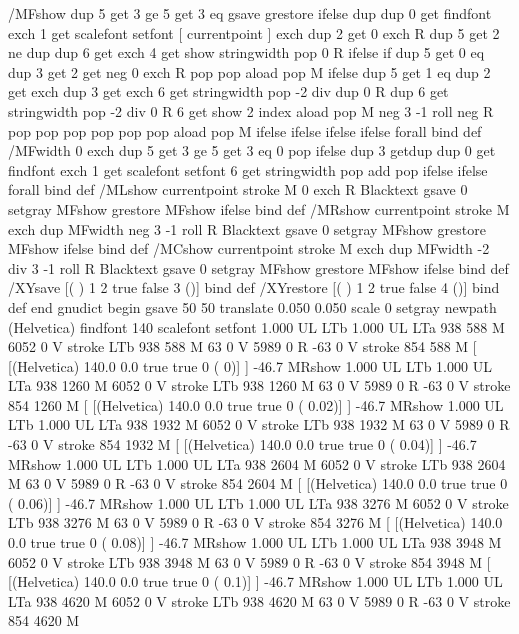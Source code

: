 /MFshow {
   { dup 5 get 3 ge
     { 5 get 3 eq {gsave} {grestore} ifelse }
     {dup dup 0 get findfont exch 1 get scalefont setfont
     [ currentpoint ] exch dup 2 get 0 exch R dup 5 get 2 ne {dup dup 6
     get exch 4 get {show} {stringwidth pop 0 R} ifelse }if dup 5 get 0 eq
     {dup 3 get {2 get neg 0 exch R pop} {pop aload pop M} ifelse} {dup 5
     get 1 eq {dup 2 get exch dup 3 get exch 6 get stringwidth pop -2 div
     dup 0 R} {dup 6 get stringwidth pop -2 div 0 R 6 get
     show 2 index {aload pop M neg 3 -1 roll neg R pop pop} {pop pop pop
     pop aload pop M} ifelse }ifelse }ifelse }
     ifelse }
   forall} bind def
/MFwidth {0 exch { dup 5 get 3 ge { 5 get 3 eq { 0 } { pop } ifelse }
 {dup 3 get{dup dup 0 get findfont exch 1 get scalefont setfont
     6 get stringwidth pop add} {pop} ifelse} ifelse} forall} bind def
/MLshow { currentpoint stroke M
  0 exch R
  Blacktext {gsave 0 setgray MFshow grestore} {MFshow} ifelse } bind def
/MRshow { currentpoint stroke M
  exch dup MFwidth neg 3 -1 roll R
  Blacktext {gsave 0 setgray MFshow grestore} {MFshow} ifelse } bind def
/MCshow { currentpoint stroke M
  exch dup MFwidth -2 div 3 -1 roll R
  Blacktext {gsave 0 setgray MFshow grestore} {MFshow} ifelse } bind def
/XYsave    { [( ) 1 2 true false 3 ()] } bind def
/XYrestore { [( ) 1 2 true false 4 ()] } bind def
end
gnudict begin
gsave
50 50 translate
0.050 0.050 scale
0 setgray
newpath
(Helvetica) findfont 140 scalefont setfont
1.000 UL
LTb
1.000 UL
LTa
938 588 M
6052 0 V
stroke
LTb
938 588 M
63 0 V
5989 0 R
-63 0 V
stroke
854 588 M
[ [(Helvetica) 140.0 0.0 true true 0 ( 0)]
] -46.7 MRshow
1.000 UL
LTb
1.000 UL
LTa
938 1260 M
6052 0 V
stroke
LTb
938 1260 M
63 0 V
5989 0 R
-63 0 V
stroke
854 1260 M
[ [(Helvetica) 140.0 0.0 true true 0 ( 0.02)]
] -46.7 MRshow
1.000 UL
LTb
1.000 UL
LTa
938 1932 M
6052 0 V
stroke
LTb
938 1932 M
63 0 V
5989 0 R
-63 0 V
stroke
854 1932 M
[ [(Helvetica) 140.0 0.0 true true 0 ( 0.04)]
] -46.7 MRshow
1.000 UL
LTb
1.000 UL
LTa
938 2604 M
6052 0 V
stroke
LTb
938 2604 M
63 0 V
5989 0 R
-63 0 V
stroke
854 2604 M
[ [(Helvetica) 140.0 0.0 true true 0 ( 0.06)]
] -46.7 MRshow
1.000 UL
LTb
1.000 UL
LTa
938 3276 M
6052 0 V
stroke
LTb
938 3276 M
63 0 V
5989 0 R
-63 0 V
stroke
854 3276 M
[ [(Helvetica) 140.0 0.0 true true 0 ( 0.08)]
] -46.7 MRshow
1.000 UL
LTb
1.000 UL
LTa
938 3948 M
6052 0 V
stroke
LTb
938 3948 M
63 0 V
5989 0 R
-63 0 V
stroke
854 3948 M
[ [(Helvetica) 140.0 0.0 true true 0 ( 0.1)]
] -46.7 MRshow
1.000 UL
LTb
1.000 UL
LTa
938 4620 M
6052 0 V
stroke
LTb
938 4620 M
63 0 V
5989 0 R
-63 0 V
stroke
854 4620 M
